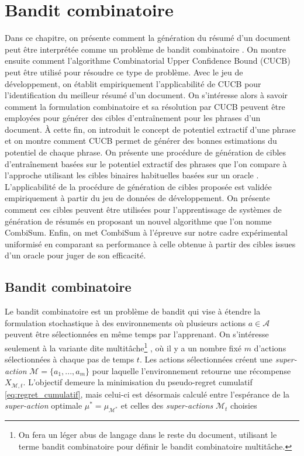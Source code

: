 \chapter{Bandit combinatoire}
\label{chap:bandit_combi}                   %

Dans ce chapitre, on présente comment la génération du résumé d'un document
peut être interprétée comme un problème de bandit combinatoire \citep{pmlr-v28-chen13a}.
On montre ensuite comment l'algorithme Combinatorial Upper Confidence Bound (CUCB) 
\citep{pmlr-v28-chen13a} peut être utilisé pour résoudre ce type de problème.
Avec le jeu de développement, on établit empiriquement l'applicabilité 
de CUCB pour l'identification du meilleur résumé d'un document.
On s'intéresse alors à savoir comment la formulation combinatoire et sa résolution 
par CUCB peuvent être employées pour générer des cibles d'entraînement 
pour les phrases d'un document.
À cette fin, on introduit le concept de potentiel extractif d'une phrase
et on montre comment CUCB permet de générer des bonnes 
estimations du potentiel de chaque phrase.
On présente une procédure de génération de cibles d'entraînement 
basées sur le potentiel extractif des phrases que l'on compare 
à l'approche utilisant les cibles binaires habituelles basées sur un oracle \citep{10.5555/3298483.3298681}.
L'applicabilité de la procédure de génération de cibles proposée 
est validée empiriquement à partir du jeu de données de développement.
On présente comment ces cibles peuvent être utilisées pour 
l'apprentissage de systèmes de génération de résumés en proposant 
un nouvel algorithme que l'on nomme CombiSum.
Enfin, on met CombiSum à l'épreuve sur notre cadre expérimental 
uniformisé en comparant sa performance à celle obtenue à partir des cibles 
issues d'un oracle pour juger de son efficacité.

\section{Bandit combinatoire}
\label{section:formulation_combi}

Le bandit combinatoire est un problème de bandit qui vise à étendre
la formulation stochastique à des environnements où plusieurs actions
$a \in \mathcal{A}$ peuvent être sélectionnées
en même temps par l'apprenant.
On s'intéresse seulement à la variante dite multitâche\footnote{On fera 
un léger abus de langage dans le reste du document, utilisant le terme 
bandit combinatoire pour définir le bandit combinatoire multitâche.} \citep{banditalgs}, où
il y a un nombre fixé $m$ d'actions sélectionnées à
chaque pas de temps $t$.
Les actions sélectionnées créent une \textit{super-action} $\mathcal{M} = \{a_1, ..., a_m\}$
pour laquelle l'environnement retourne une récompense $X_{\mathcal{M}, t}$.
L'objectif demeure la minimisation du pseudo-regret cumulatif \eqref{eq:regret_cumulatif}, 
mais celui-ci est désormais calculé entre l'espérance de
la \textit{super-action} optimale $\mu^* = \mu_{\mathcal{M}^*}$ et celles des \textit{super-actions} 
$\mathcal{M}_t$ choisies

